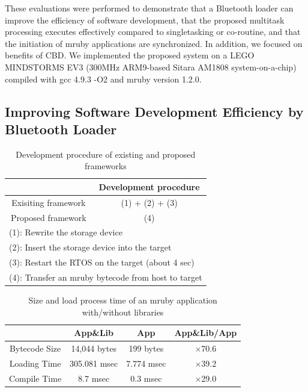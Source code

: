 \documentclass[S,R,E]{article/compsoft}
\begin{document}
These evaluations were performed to demonstrate that a Bluetooth loader can improve the efficiency of software development, that the proposed multitask processing executes effectively compared to singletasking or co-routine, and that the initiation of mruby applications are synchronized.
In addition, we focused on benefits of CBD.
We implemented the proposed system on a LEGO MINDSTORMS EV3 \cite{par:EV3} (300MHz ARM9-based Sitara AM1808 system-on-a-chip) compiled with gcc 4.9.3 -O2 and mruby version 1.2.0.


\subsection{Improving Software Development Efficiency by Bluetooth Loader}

\begin{table}[t]
    \centering
\caption{Development procedure of existing and proposed frameworks}
    \scriptsize
    {\tabcolsep=0.1cm
    \begin{tabular}{c||c}
                            & Development procedure \\ \hline
        Exisiting framework &    (1) + (2) + (3)    \\ %
        Proposed framework  &          (4)          \\ \hline
        \multicolumn{2}{l}{ (1): Rewrite the storage device} \\
        \multicolumn{2}{l}{ (2): Insert the storage device into the target} \\
        \multicolumn{2}{l}{ (3): Restart the RTOS on the target (about 4 sec)} \\
        \multicolumn{2}{l}{ (4): Transfer an mruby bytecode from host to target} \\
    \end{tabular}
    }
    \label{tab:procedure}
\end{table}

\begin{table}[t]
    \centering
\caption{Size and load process time of an mruby application with/without libraries}
    \scriptsize
    {\tabcolsep=0.1cm
    \begin{tabular}{c||c|c|c}
                        & App\&Lib     & App        &   App\&Lib/App  \\ \hline
        Bytecode Size   & 14,044 bytes & 199 bytes  &   $\times$70.6          \\ %
        Loading Time    & 305.081 msec & 7.774 msec &   $\times$39.2          \\
        Compile Time    & 8.7 msec     & 0.3 msec   &   $\times$29.0          \\
    \end{tabular}
    }
    \label{tab:size_and_time}
\end{table}
\end{document}
